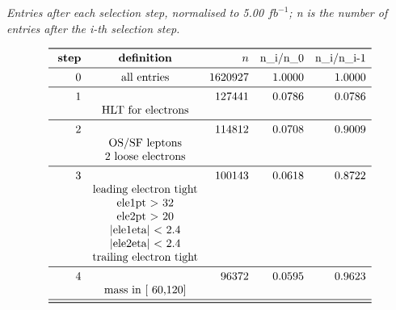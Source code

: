 \documentclass[11pt,a4paper]{article}
\begin{document}
\begin{table}
\caption{\emph{Entries after each selection step, normalised to 5.00 $fb^{-1}$; n is the number of entries after the i-th selection step.}}
\[
\begin{array}{rcrrr}
\toprule
\ \textbf{step}& \textbf{definition}  & n  & $n\_i/n\_0$ & $n\_i/n\_{i-1}$ \\ 
\midrule
 0  & \text{all entries} & 1620927 & 1.0000 & 1.0000 \\
\midrule
 1  & & 127441 & 0.0786 & 0.0786 \\
& \text{HLT for electrons} & & & \\
\midrule
 2  & & 114812 & 0.0708 & 0.9009 \\
& \text{OS/SF leptons} & & & \\
& \text{2 loose electrons} & & & \\
\midrule
 3  & & 100143 & 0.0618 & 0.8722 \\
& \text{leading electron tight} & & & \\
& \text{ele1pt >  32} & & & \\
& \text{ele2pt >  20} & & & \\
& \text{|ele1eta| < 2.4} & & & \\
& \text{|ele2eta| < 2.4} & & & \\
& \text{trailing electron tight} & & & \\
\midrule
 4  & &  96372 & 0.0595 & 0.9623 \\
& \text{mass in [ 60,120]} & & & \\
\midrule
\bottomrule
\end{array}
\]
\end{table}
\end{document}
